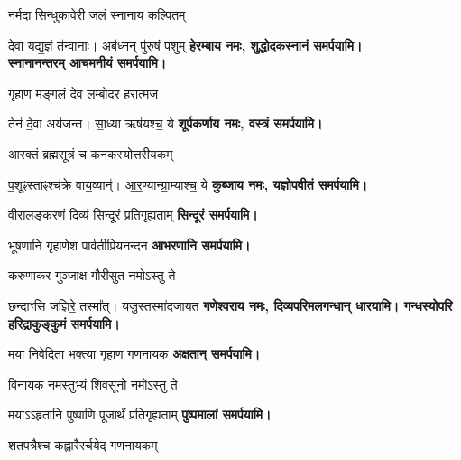\begin{center}
{नर्मदा सिन्धुकावेरी जलं स्नानाय कल्पितम्}

{दे॒वा यद्य॒ज्ञं त॑न्वा॒नाः। अब॑ध्न॒न् पु॑रुषं प॒शुम्}
\textbf{हेरम्बाय नमः, शुद्धोदकस्नानं समर्पयामि।\\
स्नानानन्तरम् आचमनीयं समर्पयामि।}
\medskip

{गृहाण मङ्गलं देव लम्बोदर हरात्मज}

{तेन॑ दे॒वा अय॑जन्त। सा॒ध्या ऋष॑यश्च॒ ये}
\textbf{शूर्पकर्णाय नमः, वस्त्रं समर्पयामि।}
\medskip

{आरक्तं ब्रह्मसूत्रं च कनकस्योत्तरीयकम्}

{प॒शूꣴस्ताꣴश्च॑क्रे वाय॒व्यान्॑। आ॒र॒ण्यान्ग्रा॒म्याश्च॒ ये}
\textbf{कुब्जाय नमः, यज्ञोपवीतं समर्पयामि।}
\medskip

{वीरालङ्करणं दिव्यं सिन्दूरं प्रतिगृह्यताम्}
\textbf{\devAya{} सिन्दूरं समर्पयामि।}\footnotemark
\medskip

{भूषणानि गृहाणेश पार्वतीप्रियनन्दन}
\textbf{\devAya{} आभरणानि समर्पयामि।}\footnotemark[\value{footnote}]
\medskip

{करुणाकर गुञ्जाक्ष गौरीसुत नमोऽस्तु ते}

{छन्दाꣳसि जज्ञिरे॒ तस्मा᳚त्। यजु॒स्तस्मा॑दजायत}
\textbf{गणेश्वराय नमः, दिव्यपरिमलगन्धान् धारयामि। गन्धस्योपरि हरिद्राकुङ्कुमं समर्पयामि।}
\medskip

{मया निवेदिता भक्त्या गृहाण गणनायक}
\textbf{\devAya{} अक्षतान् समर्पयामि।}
\medskip

{विनायक नमस्तुभ्यं शिवसूनो नमोऽस्तु ते\footnotemark[\value{footnote}]}

{मयाऽऽहृतानि पुष्पाणि पूजार्थं प्रतिगृह्यताम्}
\textbf{\devAya{} पुष्पमालां समर्पयामि।}

{शतपत्रैश्च कह्लारैरर्चयेद् गणनायकम्}


\end{center}
